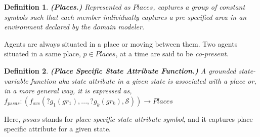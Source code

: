 \documentclass[letterpaper]{article} %
\newtheorem{definition}{Definition}
\begin{document}
\begin{definition}
\textbf{(Places.)} Represented as $\mathit{Places}$, captures a group of constant symbols such that each member individually captures a pre-specified area in an environment declared by the domain modeler.  
\end{definition}
Agents are always situated in a place or moving between them. Two agents situated in a same place, $p \in \mathit{Places}$, at a time are said to be \textit{co-present}.




\begin{definition}
    \textbf{(Place Specific State Attribute Function.)} A {\em grounded} state-variable function {\em aka} state attribute in a given state is associated with a place or, in a more general way, it is expressed as, $f_{pssas}: (f_{svs}(?g_1(gr_1),...,?g_k(gr_k),\mathcal{S})) \rightarrow 
    Places$
    \label{def:pssav}
\end{definition}
Here, $\mathit{pssas}$ stands for {\em place-specific state attribute symbol}, and it captures place specific attribute for a given state. 
\end{document}
